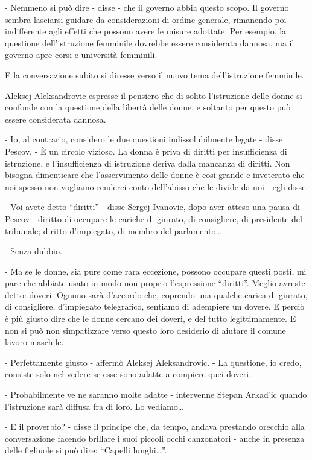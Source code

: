 - Nemmeno si può dire - disse - che il governo abbia questo scopo. Il governo sembra lasciarsi guidare da considerazioni di ordine generale, rimanendo poi indifferente agli effetti che possono avere le misure adottate. Per esempio, la questione dell'istruzione femminile dovrebbe essere considerata dannosa, ma il governo apre corsi e università femminili. 

E la conversazione subito si diresse verso il nuovo tema dell'istruzione femminile. 

Aleksej Aleksandrovic espresse il pensiero che di solito l'istruzione delle donne si confonde con la questione della libertà delle donne, e soltanto per questo può essere considerata dannosa. 

- Io, al contrario, considero le due questioni indissolubilmente legate - disse Pescov. - È un circolo vizioso. La donna è priva di diritti per insufficienza di istruzione, e l'insufficienza di istruzione deriva dalla mancanza di diritti. Non bisogna dimenticare che l'asservimento delle donne è così grande e inveterato che noi spesso non vogliamo renderci conto dell'abisso che le divide da noi - egli disse. 

- Voi avete detto ``diritti'' - disse Sergej Ivanovic, dopo aver atteso una pausa di Pescov - diritto di occupare le cariche di giurato, di consigliere, di presidente del tribunale; diritto d'impiegato, di membro del parlamento\ldots{} 

- Senza dubbio. 

- Ma se le donne, sia pure come rara eccezione, possono occupare questi posti, mi pare che abbiate usato in modo non proprio l'espressione ``diritti''. Meglio avreste detto: doveri. Ognuno sarà d'accordo che, coprendo una qualche carica di giurato, di consigliere, d'impiegato telegrafico, sentiamo di adempiere un dovere. E perciò è più giusto dire che le donne cercano dei doveri, e del tutto legittimamente. E non si può non simpatizzare verso questo loro desiderio di aiutare il comune lavoro maschile. 

- Perfettamente giusto - affermò Aleksej Aleksandrovic. - La questione, io credo, consiste solo nel vedere se esse sono adatte a compiere quei doveri. 

- Probabilmente ve ne saranno molte adatte - intervenne Stepan Arkad'ic quando l'istruzione sarà diffusa fra di loro. Lo vediamo\ldots{} 

- E il proverbio? - disse il principe che, da tempo, andava prestando orecchio alla conversazione facendo brillare i suoi piccoli occhi canzonatori - anche in presenza delle figliuole si può dire: ``Capelli lunghi\ldots{}''. 

